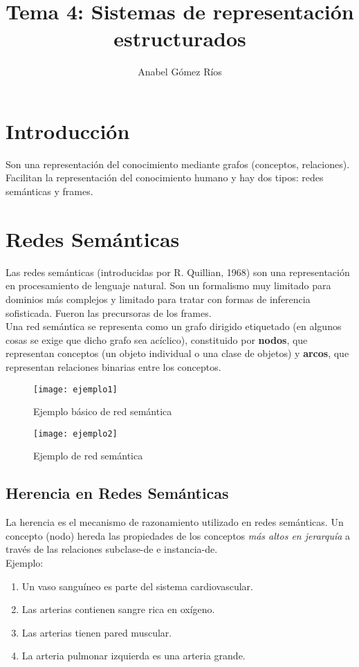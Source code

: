 \documentclass[12pt]{article}
\title{Tema 4: Sistemas de representación estructurados}
\author{Anabel G\'omez R\'ios}
\begin{document}
\maketitle

\section{Introducción}
Son una representación del conocimiento mediante grafos (conceptos, relaciones). Facilitan la representación del conocimiento humano y hay dos tipos: redes semánticas y frames.

\section{Redes Semánticas}
Las redes semánticas (introducidas por R. Quillian, 1968) son una representación en procesamiento de lenguaje natural. Son un formalismo muy limitado para dominios más complejos y limitado para tratar con formas de inferencia sofisticada. Fueron las precursoras de los frames.\\

Una red semántica se representa como un grafo dirigido etiquetado (en algunos cosas se exige que dicho grafo sea acíclico), constituido por \textbf{nodos}, que representan conceptos (un objeto individual o una clase de objetos) y \textbf{arcos}, que representan relaciones binarias entre los conceptos.
\begin{figure}[H]
\centering
\texttt{[image: ejemplo1]}
\caption{Ejemplo básico de red semántica} \label{fig:ejemplo1}
\end{figure}

\begin{figure}[H]
\centering
\texttt{[image: ejemplo2]}
\caption{Ejemplo de red semántica} \label{fig:ejemplo2}
\end{figure}

\subsection{Herencia en Redes Semánticas}
La herencia es el mecanismo de razonamiento utilizado en redes semánticas. Un concepto (nodo) hereda las propiedades de los conceptos \textit{más altos en jerarquía} a través de las relaciones subclase-de e instancia-de.\\
Ejemplo:
\begin{enumerate}
\item Un vaso sanguíneo es parte del sistema cardiovascular.
\item Las arterias contienen sangre rica en oxígeno.
\item Las arterias tienen pared muscular.
\item La arteria pulmonar izquierda es una arteria grande.
\end{enumerate}
\end{document}
